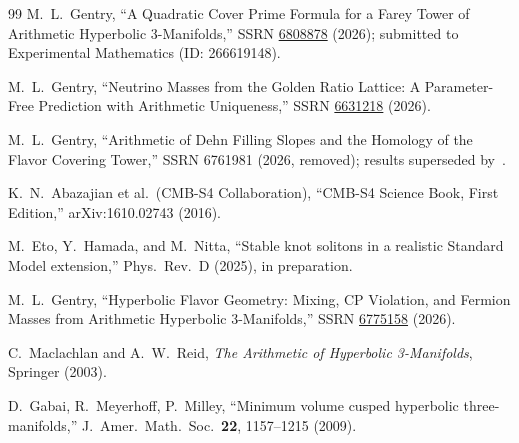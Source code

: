 ﻿\documentclass[12pt]{article}
\theoremstyle{definition}
\begin{document}
\begin{thebibliography}{99}
  M.~L.~Gentry,
  ``A Quadratic Cover Prime Formula for a Farey Tower of Arithmetic
  Hyperbolic 3-Manifolds,''
  SSRN \href{https://doi.org/10.2139/ssrn.6808878}{6808878} (2026);
  submitted to Experimental Mathematics (ID: 266619148).

  M.~L.~Gentry,
  ``Neutrino Masses from the Golden Ratio Lattice:
  A Parameter-Free Prediction with Arithmetic Uniqueness,''
  SSRN \href{https://doi.org/10.2139/ssrn.6631218}{6631218} (2026).

  M.~L.~Gentry,
  ``Arithmetic of Dehn Filling Slopes and the Homology of the Flavor Covering Tower,''
  SSRN 6761981 (2026, removed); results superseded by~\cite{Gentry:Lucas}.


  K.~N.~Abazajian et al.\ (CMB-S4 Collaboration),
  ``CMB-S4 Science Book, First Edition,''
  arXiv:1610.02743 (2016).

  M.~Eto, Y.~Hamada, and M.~Nitta,
  ``Stable knot solitons in a realistic Standard Model extension,''
  Phys.\ Rev.\ D (2025), in preparation.


  M.~L.~Gentry,
  ``Hyperbolic Flavor Geometry: Mixing, CP Violation, and Fermion Masses
  from Arithmetic Hyperbolic 3-Manifolds,''
  SSRN \href{https://doi.org/10.2139/ssrn.6775158}{6775158} (2026).

  C.~Maclachlan and A.~W.~Reid,
  \emph{The Arithmetic of Hyperbolic 3-Manifolds},
  Springer (2003).

  D.~Gabai, R.~Meyerhoff, P.~Milley,
  ``Minimum volume cusped hyperbolic three-manifolds,''
  J.\ Amer.\ Math.\ Soc.\ \textbf{22}, 1157--1215 (2009).

\end{thebibliography}
\end{document}
